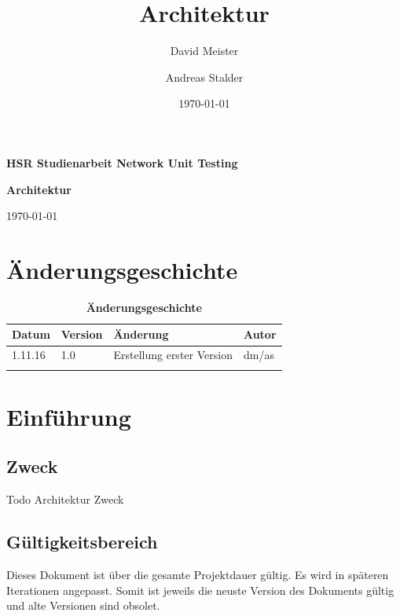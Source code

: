 \documentclass[a4,12pt]{scrartcl}
\title{Architektur}
\author{David Meister \and Andreas Stalder}
\date{\today}
\begin{document}
\begin{titlepage}
	\centering
	\vspace{5cm}
	\begin{center}
	\end{center}
	\vspace{8cm}
	\raggedright
	{\bfseries HSR Studienarbeit Network Unit Testing\par}
	{\huge\bfseries Architektur \par}
	\vspace{1cm}
	{\theauthor \par}
	{\today\par}

\end{titlepage}

\section{Änderungsgeschichte}

\begin{table}[htb]
\centering
    \begin{tabular}{@{} l l l l@{}}\toprule    
    {Datum} & {Version} & {Änderung} & {Autor}\\ \midrule
    1.11.16 & 1.0 & Erstellung erster Version & dm/as\\ \addlinespace
    \end{tabular}
\caption{\textbf{Änderungsgeschichte}}
\end{table}

\newpage

\tableofcontents
\newpage


\section{Einführung}
\subsection{Zweck}
Todo Architektur Zweck
\subsection{Gültigkeitsbereich}
Dieses Dokument ist über die gesamte Projektdauer gültig. Es wird in späteren Iterationen angepasst. Somit ist jeweils die neuste Version des Dokuments gültig und alte Versionen sind obsolet.
\end{document}
